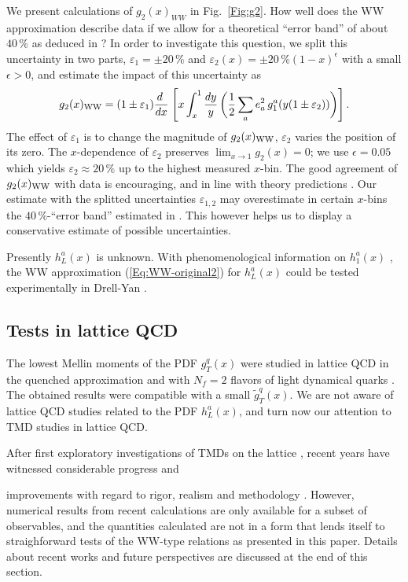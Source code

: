 \documentclass[a4paper,11pt]{article}
\newcommand{\blue}[1]{{\color{blue} #1}}
\newcommand{\be}{\begin{equation}}
\newcommand{\ee}{\end{equation}}
\begin{document}
We present calculations of $g_2(x)_{WW}$ in Fig.~\ref{Fig:g2}.
How well does the WW approximation describe data if we allow for a
theoretical ``error band'' of about $40\,\%$ as deduced in 
\cite{Accardi:2009au}? In order to investigate this question, 
we split this uncertainty in two parts, $\varepsilon_1=\pm 20\,\%$ and 
$\varepsilon_2(x)=\pm 20\,\%(1-x)^\epsilon$ with a small $\epsilon>0$,
and estimate the impact of this uncertainty as 
\be\label{Eq:g2-in-WW-model-violation}
    g_2(x)_{\rm WW} = (1\pm\varepsilon_1)\frac{ d\;}{ d x}\;\Biggl[
    x\int_x^1\frac{ d y}{y} \,\biggl(
    \frac12\sum_ae_a^2\,g_1^a(y(1\pm\varepsilon_2))\biggr)\Biggr]\,.
\ee
The effect of $\varepsilon_1$ is to change the magnitude
of $g_2(x)_{\rm WW}$, $\varepsilon_2$ varies the position of its zero.
The $x$-dependence of $\varepsilon_2$ preserves $\lim_{x\to1}g_2(x)= 0$; 
we use $\epsilon=0.05$ which yields $\varepsilon_2\approx 20\,\%$ up to 
the highest measured $x$-bin.
The good agreement of $g_2(x)_{\rm WW}$ with data is encouraging,
and in line with theory predictions \cite{Balla:1997hf}.
Our estimate with the splitted uncertainties 
$\varepsilon_{1,2}$ may overestimate in certain $x$-bins the 
$40\,\%$-``error band'' estimated in \cite{Accardi:2009au}. This however 
helps us to display a conservative estimate of possible uncertainties.

Presently $h_L^a(x)$ is unknown.
With phenomenological information on $h_1^a(x)$
\cite{Efremov:2006qm,Anselmino:2007fs,Anselmino:2008jk}, 
the WW approximation (\ref{Eq:WW-original2}) for $h_L^a(x)$ could 
be tested experimentally in Drell-Yan \cite{Koike:2008du}.


\subsection{Tests in lattice QCD}
\label{Sec-3.5:WW-lattice}

\blue{The lowest Mellin moments of the PDF $g_T^q(x)$ were studied in
lattice QCD in the quenched approximation \cite{Gockeler:2000ja} 
and with $N_f = 2$ flavors of light dynamical quarks \cite{Gockeler:2005vw}.
The obtained results were compatible with a small $\tilde{g}_T^q(x)$. 
We are not aware of lattice QCD studies related to the PDF $h_L^a(x)$,
and turn now our attention to TMD studies in lattice QCD.

After first exploratory investigations of TMDs on the lattice
\cite{Hagler:2009mb,Musch:2010ka}, recent years have witnessed considerable
progress and} improvements with regard to rigor, realism and methodology
\cite{Yoon:2016dyh,%
Engelhardt:2015xja,%
Ji:2014hxa,%
Musch:2011er%
}.
However, numerical results from recent calculations are only available 
for a subset of observables, and the quantities calculated are not in a 
form that lends itself to straighforward tests of the WW-type relations 
as presented in this paper. Details about recent works and future 
perspectives are discussed at the end of this section.
\end{document}
